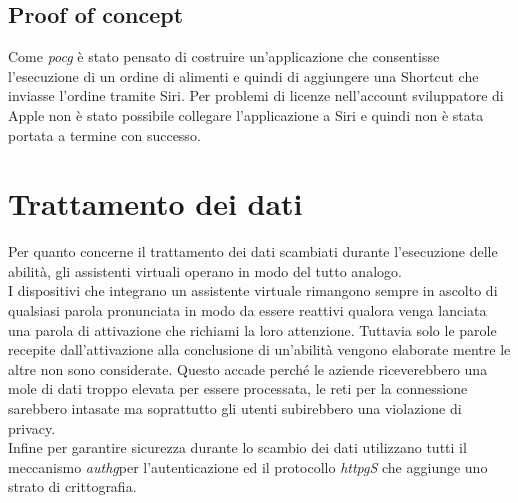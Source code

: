 	\subsection{Proof of concept}
	Come \emph{\gls{pocg}} è stato pensato di costruire un'applicazione che consentisse l'esecuzione di un ordine di alimenti e quindi di aggiungere una Shortcut che inviasse l'ordine tramite Siri. Per problemi di licenze nell'account sviluppatore di Apple non è stato possibile collegare l'applicazione a Siri e quindi non è stata portata a termine con successo.

\section{Trattamento dei dati}
Per quanto concerne il trattamento dei dati scambiati durante l'esecuzione delle abilità, gli assistenti virtuali operano in modo del tutto analogo. \\
I dispositivi che integrano un assistente virtuale rimangono sempre in ascolto di qualsiasi parola pronunciata in modo da essere reattivi qualora venga lanciata una parola di attivazione che richiami la loro attenzione. Tuttavia solo le parole recepite dall'attivazione alla conclusione di un'abilità vengono elaborate mentre le altre non sono considerate. Questo accade perché le aziende riceverebbero una mole di dati troppo elevata per essere processata, le reti per la connessione sarebbero intasate ma soprattutto gli utenti subirebbero una violazione di privacy. \\
Infine per garantire sicurezza durante lo scambio dei dati utilizzano tutti il meccanismo \emph{\gls{authg}}\glsfirstoccur per l'autenticazione ed il protocollo \emph{\gls{httpg}S} che aggiunge uno strato di crittografia.
